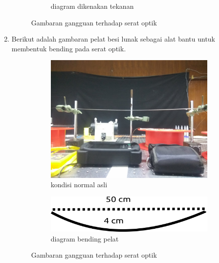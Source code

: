 \documentclass[12pt]{article}
\begin{document}
\begin{enumerate}
\begin{figure}[h!]
\begin{subfigure}[b]{0.3\textwidth}
					\caption{{\small diagram dikenakan tekanan}}			
				\end{subfigure}
				\caption[Uji Peturbasi]{\small{Gambaran gangguan terhadap serat optik}}
			\end{figure}
		
		\item Berikut adalah gambaran pelat besi lunak sebagai alat bantu untuk membentuk bending pada serat optik.
		
			\begin{figure}[h!]
				\centering
				\captionsetup{justification=centering}
				\begin{subfigure}[b]{0.2\textwidth}
					\includegraphics[width=\textwidth]{images/Bab_4/Bab_4_2a}	
					\caption{{\small kondisi normal asli}}		
				\end{subfigure}
				\begin{subfigure}[b]{0.2\textwidth}
					\includegraphics[width=\linewidth]{images/Bab_4/Bab_4_2b}
					\caption{{\small diagram bending pela}t}			
				\end{subfigure}
				\caption[Uji Peturbasi]{\small{Gambaran gangguan terhadap serat optik }}
			\end{figure}
		
	\end{enumerate}
\end{document}
